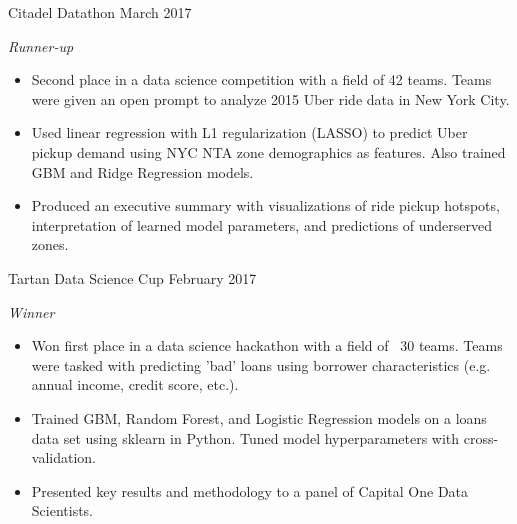 \documentclass[print]{friggeri-cv} %
\begin{document}
\begin{entrylist}
\entry
{Citadel Datathon}
{March 2017}
{\emph{Runner-up}
\begin{itemize}
\item Second place in a data science competition with a field of 42 teams. Teams were given an open prompt to analyze 2015 Uber ride data in New York City.
\item Used linear regression with L1 regularization (LASSO) to predict Uber pickup demand using NYC NTA zone demographics as features. Also trained GBM and Ridge Regression models.
\item Produced an executive summary with visualizations of ride pickup hotspots, interpretation of learned model parameters, and predictions of underserved zones.
\end{itemize}}
\entry
{Tartan Data Science Cup}
{February 2017}
{\emph{Winner}
\begin{itemize}
\item Won first place in a data science hackathon with a field of ~30 teams. Teams were tasked with predicting 'bad' loans using borrower characteristics (e.g. annual income, credit score, etc.).
\item Trained GBM, Random Forest, and Logistic Regression models on a loans data set using sklearn in Python. Tuned model hyperparameters with cross-validation. 
\item Presented key results and methodology to a panel of Capital One Data Scientists. 
\end{itemize}}
\end{entrylist}
\end{document}

